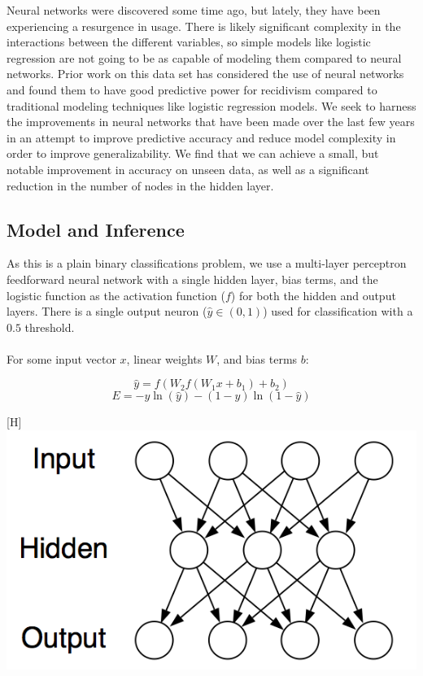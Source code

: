 \documentclass[a4paper]{article}
\theoremstyle{plain}
\begin{document}
Neural networks were discovered some time ago, but lately, they have been experiencing a resurgence in usage. There is likely significant complexity in the interactions between the different variables, so simple models like logistic regression are not going to be as capable of modeling them compared to neural networks. Prior work on this data set has considered the use of neural networks and found them to have good predictive power for recidivism compared to traditional modeling techniques like logistic regression models. We seek to harness the improvements in neural networks that have been made over the last few years in an attempt to improve predictive accuracy and reduce model complexity in order to improve generalizability. We find that we can achieve a small, but notable improvement in accuracy on unseen data, as well as a significant reduction in the number of nodes in the hidden layer.

\subsection{Model and Inference}

As this is a plain binary classifications problem, we use a multi-layer perceptron feedforward neural network with a single hidden layer, bias terms, and the logistic function as the activation function ($f$) for both the hidden and output layers. There is a single output neuron ($\hat{y} \in (0, 1)$) used for classification with a $0.5$ threshold.

\paragraph{}
For some input vector $x$, linear weights $W$, and bias terms $b$:

\[ \hat{y} = f( W_2  f( W_1 x + b_1 ) + b_2 ) \]
\[ E = - y \ln( \hat{y} ) - (1 - y) \ln ( 1 - \hat{y} ) \]

\begin{center}\vspace{1cm}[H]
\includegraphics[width=0.6\linewidth]{neural_network}
\end{center}\vspace{1cm}
\end{document}
